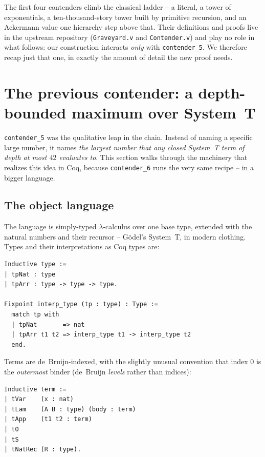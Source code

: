 \documentclass[11pt,a4paper]{article}
\theoremstyle{plain}
\theoremstyle{definition}
\theoremstyle{remark}
\begin{document}
The first four contenders climb the classical ladder -- a literal, a
tower of exponentials, a ten-thousand-story tower built by primitive
recursion, and an Ackermann value one hierarchy step above that.  Their
definitions and proofs live in the upstream repository
(\texttt{Graveyard.v} and \texttt{Contender.v}) and play no role in
what follows: our construction interacts \emph{only} with
\texttt{contender\_5}.  We therefore recap just that one, in exactly
the amount of detail the new proof needs.

\section{The previous contender: a depth-bounded maximum over System~T}
\label{sec:contender-5}

\texttt{contender\_5} was the qualitative leap in the chain.  Instead
of naming a specific large number, it names \emph{the largest number
that any closed System~T term of depth at most $42$ evaluates to}.
This section walks through the machinery that realizes this idea in
Coq, because \texttt{contender\_6} runs the very same recipe -- in a
bigger language.

\subsection{The object language}

The language is simply-typed $\lambda$-calculus over one base type,
extended with the natural numbers and their recursor -- G\"odel's
System~T, in modern clothing.  Types and their interpretations as Coq
types are:

\begin{lstlisting}
Inductive type :=
| tpNat : type
| tpArr : type -> type -> type.

Fixpoint interp_type (tp : type) : Type :=
  match tp with
  | tpNat       => nat
  | tpArr t1 t2 => interp_type t1 -> interp_type t2
  end.
\end{lstlisting}

Terms are de~Bruijn-indexed, with the slightly unusual convention
that index $0$ is the \emph{outermost} binder (de~Bruijn
\emph{levels} rather than indices):

\begin{lstlisting}
Inductive term :=
| tVar    (x : nat)
| tLam    (A B : type) (body : term)
| tApp    (t1 t2 : term)
| tO
| tS
| tNatRec (R : type).
\end{lstlisting}
\end{document}
